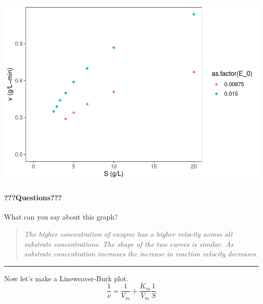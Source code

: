 \documentclass[
]{article}
\newenvironment{Shaded}{\begin{snugshade}}{\end{snugshade}}
\newcommand{\AttributeTok}[1]{\textcolor[rgb]{0.77,0.63,0.00}{#1}}
\newcommand{\DecValTok}[1]{\textcolor[rgb]{0.00,0.00,0.81}{#1}}
\newcommand{\FunctionTok}[1]{\textcolor[rgb]{0.00,0.00,0.00}{#1}}
\newcommand{\NormalTok}[1]{#1}
\newcommand{\OtherTok}[1]{\textcolor[rgb]{0.56,0.35,0.01}{#1}}
\newcommand{\SpecialCharTok}[1]{\textcolor[rgb]{0.00,0.00,0.00}{#1}}
\newcommand{\StringTok}[1]{\textcolor[rgb]{0.31,0.60,0.02}{#1}}
\begin{document}
\includegraphics{Bioprocess_Engineering_files/figure-latex/unnamed-chunk-29-1.pdf}

\hypertarget{questions-10}{%
\paragraph{???Questions???}\label{questions-10}}

What can you say about this graph?

\begin{quote}
\emph{The higher concentration of enzyme has a higher velocity across all substrate concentrations. The shape of the two curves is similar. As substrate concentration increases the increase in reaction velocity decreases.}
\end{quote}

\begin{center}\rule{0.5\linewidth}{0.5pt}\end{center}

Now let's make a Lineweaver-Burk plot.
\[\frac{1}{\nu} = \frac{1}{V_m} + \frac{K_m}{V_m} \frac{1}{S}\]

\begin{Shaded}
\end{Shaded}
\end{document}
